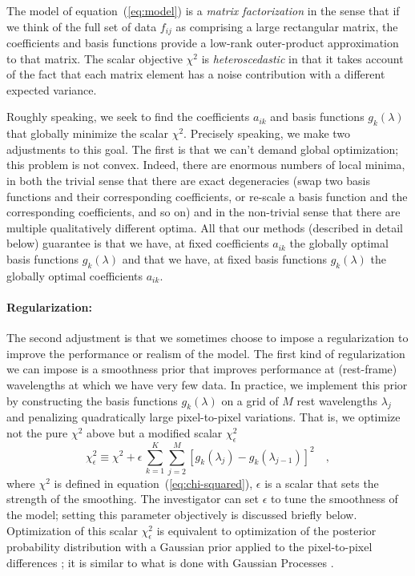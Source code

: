 \documentclass[12pt,preprint]{aastex}
\newcommand{\equationname}{equation}
\begin{document}
The model of \equationname~(\ref{eq:model}) is a \emph{matrix
  factorization} in the sense that if we think of the full set of data
$f_{ij}$ as comprising a large rectangular matrix, the coefficients
and basis functions provide a low-rank outer-product approximation to
that matrix.  The scalar objective $\chi^2$ is \emph{heteroscedastic}
in that it takes account of the fact that each matrix element has a
noise contribution with a different expected variance.

Roughly speaking, we seek to find the coefficients $a_{ik}$ and basis
functions $g_k(\lambda)$ that globally minimize the scalar $\chi^2$.
Precisely speaking, we make two adjustments to this goal. The first is
that we can't demand global optimization; this problem is not convex.
Indeed, there are enormous numbers of local minima, in both the
trivial sense that there are exact degeneracies (swap two basis
functions and their corresponding coefficients, or re-scale a basis
function and the corresponding coefficients, and so on) and in the
non-trivial sense that there are multiple qualitatively different
optima. All that our methods (described in detail below) guarantee is
that we have, at fixed coefficients $a_{ik}$ the globally optimal
basis functions $g_k(\lambda)$ and that we have, at fixed basis
functions $g_k(\lambda)$ the globally optimal coefficients $a_{ik}$.

\paragraph{Regularization:}
The second adjustment is that we sometimes choose to impose a
regularization to improve the performance or realism of the model.
The first kind of regularization we can impose is a smoothness prior
that improves performance at (rest-frame) wavelengths at which we have
very few data. In practice, we implement this prior by constructing
the basis functions $g_k(\lambda)$ on a grid of $M$ rest wavelengths
$\lambda_j$ and penalizing quadratically large pixel-to-pixel
variations. That is, we optimize not the pure $\chi^2$ above but a
modified scalar $\chi_{\epsilon}^2$
\begin{equation}\label{eq:smoothness}
\chi_{\epsilon}^2 \equiv \chi^2
 + \epsilon\,\sum_{k=1}^K \sum_{j=2}^{M}
 \left[g_k(\lambda_{j})-g_k(\lambda_{j-1})\right]^2
\quad ,
\end{equation}
where $\chi^2$ is defined in \equationname~(\ref{eq:chi-squared}),
$\epsilon$ is a scalar that sets the strength of the smoothing.  The
investigator can set $\epsilon$ to tune the smoothness of the model;
setting this parameter objectively is discussed briefly below.
Optimization of this scalar $\chi_{\epsilon}^2$ is equivalent to
optimization of the posterior probability distribution with a Gaussian
prior applied to the pixel-to-pixel differences \citep[for
  example,][]{smoothness}; it is similar to what is done with Gaussian
Processes \citep[for example,][]{Rasmussen06a}.
\end{document}
